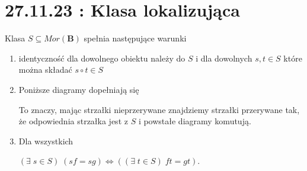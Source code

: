 \section{27.11.23 : Klasa lokalizująca}

\begin{definition}
  Klasa $S\subseteq Mor(\mathbf{B})$ spełnia następujące warunki
  \begin{enumerate}
    \item identyczność dla dowolnego obiektu należy do $S$ i dla dowolnych $s,t\in S$ które można składać $s\circ t\in S$
    \item Poniższe diagramy dopełniają się
      \begin{center}\end{center}
      To znaczy, mając strzałki nieprzerywane znajdziemy strzałki przerywane tak, że odpowiednia strzałka jest z $S$ i powstałe diagramy komutują.
    \item Dla wszystkich  $(\exists\;s\in S)\;(sf=sg)\iff ((\exists\;t\in S)\;ft=gt)$.
  \end{enumerate}
\end{definition}

